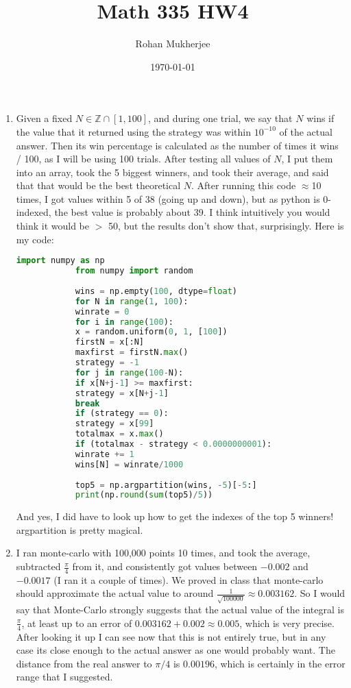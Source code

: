 \documentclass[12pt]{article}
\title{Math 335 HW4}
\date{\today}
\author{Rohan Mukherjee}
\def\mbb#1{\mathbb{#1}}
\def\bZ{\mbb{Z}}
\theoremstyle{definition}
\theoremstyle{remark}
\begin{document}
	\maketitle
	\begin{enumerate}[leftmargin=\labelsep]
		\item Given a fixed $N \in \bZ \cap [1, 100]$, and during one trial, we say that $N$ wins if the value that it returned using the strategy was within $10^{-10}$ of the actual answer. Then its win percentage is calculated as the number of times it wins / 100, as I will be using 100 trials. After testing all values of $N$, I put them into an array, took the 5 biggest winners, and took their average, and said that that would be the best theoretical $N$. After running this code $\approx$10 times, I got values within 5 of 38 (going up and down), but as python is 0-indexed, the best value is probably about 39. I think intuitively you would think it would be $>$ 50, but the results don't show that, surprisingly. Here is my code:
		\begin{lstlisting}[language=Python]
			import numpy as np
			from numpy import random
			
			wins = np.empty(100, dtype=float)
			for N in range(1, 100):
			winrate = 0
			for i in range(100):
			x = random.uniform(0, 1, [100])
			firstN = x[:N]
			maxfirst = firstN.max()
			strategy = -1
			for j in range(100-N):
			if x[N+j-1] >= maxfirst:
			strategy = x[N+j-1]
			break
			if (strategy == 0):
			strategy = x[99]
			totalmax = x.max()
			if (totalmax - strategy < 0.0000000001):
			winrate += 1
			wins[N] = winrate/1000
			
			top5 = np.argpartition(wins, -5)[-5:]
			print(np.round(sum(top5)/5))
		\end{lstlisting} And yes, I did have to look up how to get the indexes of the top 5 winners! argpartition is pretty magical.
	
		\item I ran monte-carlo with 100,000 points 10 times, and took the average, subtracted $\frac{\pi}4$ from it, and consistently got values between $-0.002$ and $-0.0017$ (I ran it a couple of times). We proved in class that monte-carlo should approximate the actual value to around $\frac1{\sqrt{100000}} \approx 0.003162$. So I would say that Monte-Carlo strongly suggests that the actual value of the integral is $\frac{\pi}4$, at least up to an error of $0.003162+0.002 \approx 0.005$, which is very precise. After looking it up I can see now that this is not entirely true, but in any case its close enough to the actual answer as one would probably want. The distance from the real answer to $\pi/4$ is $0.00196$, which is certainly in the error range that I suggested.
		

\end{enumerate}
\end{document}
